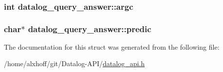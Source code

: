 \subsubsection[{\texorpdfstring{argc}{argc}}]{\setlength{\rightskip}{0pt plus 5cm}int datalog\+\_\+query\+\_\+answer\+::argc}\hypertarget{structdatalog__query__answer_a29951460bcc8f936f7f349c851ba3819}{}\label{structdatalog__query__answer_a29951460bcc8f936f7f349c851ba3819}
\subsubsection[{\texorpdfstring{predic}{predic}}]{\setlength{\rightskip}{0pt plus 5cm}char$\ast$ datalog\+\_\+query\+\_\+answer\+::predic}\hypertarget{structdatalog__query__answer_a721776aabf590192c96df972333d38d4}{}\label{structdatalog__query__answer_a721776aabf590192c96df972333d38d4}


The documentation for this struct was generated from the following file\+:\begin{DoxyCompactItemize}
\item 
/home/alxhoff/git/\+Datalog-\/\+A\+P\+I/\hyperlink{datalog__api_8h}{datalog\+\_\+api.\+h}\end{DoxyCompactItemize}
